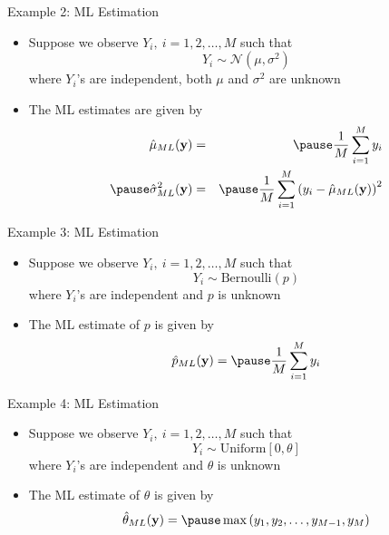 \documentclass[t]{beamer}
\begin{document}
\begin{frame}{Example 2: ML Estimation}
  \footnotesize
  \begin{itemize}
    \item \pause Suppose we observe $Y_i, \ i=1,2,\ldots,M$ such that 
      \begin{equation*}
        Y_i \sim \mathcal{N}(\mu, \sigma^2)
      \end{equation*}
      where $Y_i$'s are independent, both $\mu$ and $\sigma^2$ are unknown
    \item \pause The ML estimates are given by
      \begin{eqnarray*}
        \hat{\mu}_{ML}(\mathbf{y}) & = & \pause \frac{1}{M} \sum_{i=1}^M y_i \\ \pause
        \hat{\sigma}^2_{ML}(\mathbf{y}) & = & \pause \frac{1}{M} \sum_{i=1}^M \left(y_i - \hat{\mu}_{ML}(\mathbf{y})\right)^2
      \end{eqnarray*}
  \end{itemize}
  \normalsize
\end{frame}

\begin{frame}{Example 3: ML Estimation}
  \footnotesize
  \begin{itemize}
    \item \pause Suppose we observe $Y_i, \ i=1,2,\ldots,M$ such that 
      \begin{equation*}
        Y_i \sim \text{Bernoulli}(p)
      \end{equation*}
      where $Y_i$'s are independent and $p$ is unknown
    \item \pause The ML estimate of $p$ is given by
      \begin{eqnarray*}
        \hat{p}_{ML}(\mathbf{y}) =  \pause \frac{1}{M} \sum_{i=1}^M y_i 
      \end{eqnarray*}
  \end{itemize}
  \normalsize
\end{frame}

\begin{frame}{Example 4: ML Estimation}
  \footnotesize
  \begin{itemize}
    \item \pause Suppose we observe $Y_i, \ i=1,2,\ldots,M$ such that 
      \begin{equation*}
        Y_i \sim \text{Uniform}[0,\theta]
      \end{equation*}
      where $Y_i$'s are independent and $\theta$ is unknown
    \item \pause The ML estimate of $\theta$ is given by
      \begin{eqnarray*}
        \hat{\theta}_{ML}(\mathbf{y}) =  \pause \max\left(y_1,y_2,\ldots,y_{M-1},y_M \right)
      \end{eqnarray*}
  \end{itemize}
  \normalsize
\end{frame}
\end{document}
